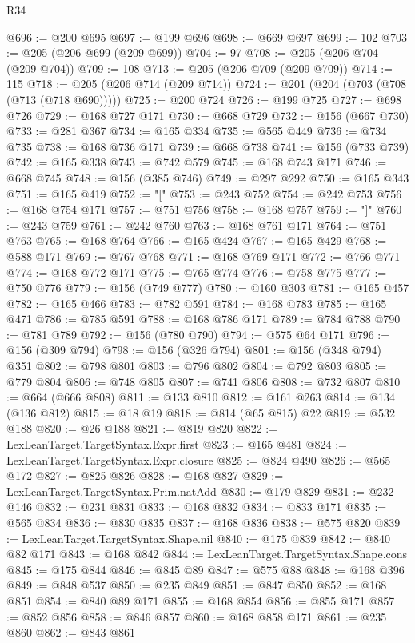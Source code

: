 \begin{lexlean}{R34}
\begin{coremodule}
@696 := @200 @695
@697 := @199 @696
@698 := @669 @697
@699 := 102
@703 := @205 (@206 @699 (@209 @699))
@704 := 97
@708 := @205 (@206 @704 (@209 @704))
@709 := 108
@713 := @205 (@206 @709 (@209 @709))
@714 := 115
@718 := @205 (@206 @714 (@209 @714))
@724 := @201 (@204 (@703 (@708 (@713 (@718 @690)))))
@725 := @200 @724
@726 := @199 @725
@727 := @698 @726
@729 := @168 @727 @171
@730 := @668 @729
@732 := @156 (@667 @730)
@733 := @281 @367
@734 := @165 @334
@735 := @565 @449
@736 := @734 @735
@738 := @168 @736 @171
@739 := @668 @738
@741 := @156 (@733 @739)
@742 := @165 @338
@743 := @742 @579
@745 := @168 @743 @171
@746 := @668 @745
@748 := @156 (@385 @746)
@749 := @297 @292
@750 := @165 @343
@751 := @165 @419
@752 := "["
@753 := @243 @752
@754 := @242 @753
@756 := @168 @754 @171
@757 := @751 @756
@758 := @168 @757
@759 := "]"
@760 := @243 @759
@761 := @242 @760
@763 := @168 @761 @171
@764 := @751 @763
@765 := @168 @764
@766 := @165 @424
@767 := @165 @429
@768 := @588 @171
@769 := @767 @768
@771 := @168 @769 @171
@772 := @766 @771
@774 := @168 @772 @171
@775 := @765 @774
@776 := @758 @775
@777 := @750 @776
@779 := @156 (@749 @777)
@780 := @160 @303
@781 := @165 @457
@782 := @165 @466
@783 := @782 @591
@784 := @168 @783
@785 := @165 @471
@786 := @785 @591
@788 := @168 @786 @171
@789 := @784 @788
@790 := @781 @789
@792 := @156 (@780 @790)
@794 := @575 @64 @171
@796 := @156 (@309 @794)
@798 := @156 (@326 @794)
@801 := @156 (@348 @794) @351
@802 := @798 @801
@803 := @796 @802
@804 := @792 @803
@805 := @779 @804
@806 := @748 @805
@807 := @741 @806
@808 := @732 @807
@810 := @664 (@666 @808)
@811 := @133 @810
@812 := @161 @263
@814 := @134 (@136 @812)
@815 := @18 @19
@818 := @814 (@65 @815) @22
@819 := @532 @188
@820 := @26 @188
@821 := @819 @820
@822 := LexLeanTarget.TargetSyntax.Expr.first
@823 := @165 @481
@824 := LexLeanTarget.TargetSyntax.Expr.closure
@825 := @824 @490
@826 := @565 @172
@827 := @825 @826
@828 := @168 @827
@829 := LexLeanTarget.TargetSyntax.Prim.natAdd
@830 := @179 @829
@831 := @232 @146
@832 := @231 @831
@833 := @168 @832
@834 := @833 @171
@835 := @565 @834
@836 := @830 @835
@837 := @168 @836
@838 := @575 @820
@839 := LexLeanTarget.TargetSyntax.Shape.nil
@840 := @175 @839
@842 := @840 @82 @171
@843 := @168 @842
@844 := LexLeanTarget.TargetSyntax.Shape.cons
@845 := @175 @844
@846 := @845 @89
@847 := @575 @88
@848 := @168 @396
@849 := @848 @537
@850 := @235 @849
@851 := @847 @850
@852 := @168 @851
@854 := @840 @89 @171
@855 := @168 @854
@856 := @855 @171
@857 := @852 @856
@858 := @846 @857
@860 := @168 @858 @171
@861 := @235 @860
@862 := @843 @861

\end{coremodule}
\end{lexlean}
